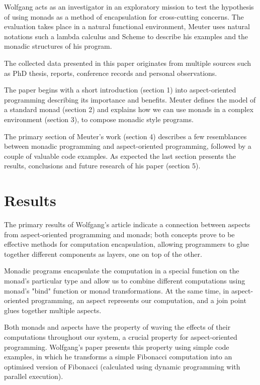 \documentclass[twocolumn, 9pt]{article}
\begin{document}
Wolfgang acts as an investigator in an exploratory mission to test the hypothesis of using monads as a method of encapsulation for cross-cutting concerns. The evaluation takes place in a natural functional environment, Meuter uses natural notations such a lambda calculus and Scheme to describe his examples and the monadic structures of his program.

The collected data presented in this paper originates from multiple sources such as PhD thesis, reports, conference records and personal observations. 

The paper begins with a short introduction (section 1) into aspect-oriented programming describing its importance and benefits. Meuter defines the model of a standard monad (section 2) and explains how we can use monads in a complex environment (section 3), to compose monadic style programs.

The primary section of Meuter's work (section 4) describes a few resemblances between monadic programming and aspect-oriented programming, followed by a couple of valuable code examples. As expected the last section presents the results, conclusions and future research of his paper (section 5).

\section{Results}
\label{sec::results}

The primary results of Wolfgang's article indicate a connection between aspects from aspect-oriented programming and monads; both concepts prove to be effective methods for computation encapsulation, allowing programmers to glue together different components as layers, one on top of the other.

Monadic programs encapsulate the computation in a special function on the monad's particular type and allow us to combine different \cite{wiki:monad} \cite{main} computations using monad's "bind" function or monad transformations. At the same time, in aspect-oriented programming, an aspect represents our computation, and a join point glues together multiple aspects.

Both monads and aspects have the property of waving the effects of their computations throughout our system, a crucial property for aspect-oriented programming. Wolfgang's paper presents this property using simple code examples, in which he transforms a simple Fibonacci computation into an optimised version of Fibonacci (calculated using dynamic programming with parallel execution). 
\end{document}
